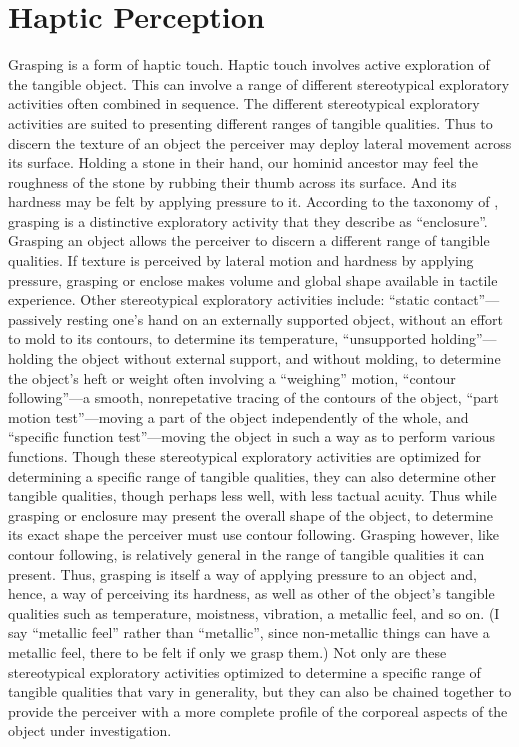 
\section{Haptic Perception} %
\label{sec:haptic_perception}



Grasping is a form of haptic touch. Haptic touch involves active exploration of the tangible object. This can involve a range of different stereotypical exploratory activities often combined in sequence. The different stereotypical exploratory activities are suited to presenting different ranges of tangible qualities. Thus to discern the texture of an object the perceiver may deploy lateral movement across its surface. Holding a stone in their hand, our hominid ancestor may feel the roughness of the stone by rubbing their thumb across its surface. And its hardness may be felt by applying pressure to it. According to the taxonomy of \citet{Lederman:1987fr}, grasping is a distinctive exploratory activity that they describe as ``enclosure''. Grasping an object allows the perceiver to discern a different range of tangible qualities. If texture is perceived by lateral motion and hardness by applying pressure, grasping or enclose makes volume and global shape available in tactile experience. Other stereotypical exploratory activities include: ``static contact''---passively resting one's hand on an externally supported object, without an effort to mold to its contours, to determine its temperature, ``unsupported holding''---holding the object without external support, and without molding, to determine the object's heft or weight often involving a ``weighing'' motion, ``contour following''---a smooth, nonrepetative tracing of the contours of the object, ``part motion test''---moving a part of the object independently of the whole, and ``specific function test''---moving the object in such a way as to perform various functions. Though these stereotypical exploratory activities are optimized for determining a specific range of tangible qualities, they can also determine other tangible qualities, though perhaps less well, with less tactual acuity. Thus while grasping or enclosure may present the overall shape of the object, to determine its exact shape the perceiver must use contour following. Grasping however, like contour following, is relatively general in the range of tangible qualities it can present. Thus, grasping is itself a way of applying pressure to an object and, hence, a way of perceiving its hardness, as well as other of the object's tangible qualities such as temperature, moistness, vibration, a metallic feel, and so on. (I say ``metallic feel'' rather than ``metallic'', since non-metallic things can have a metallic feel, there to be felt if only we grasp them.) Not only are these stereotypical exploratory activities optimized to determine a specific range of tangible qualities that vary in generality, but they can also be chained together to provide the perceiver with a more complete profile of the corporeal aspects of the object under investigation.

